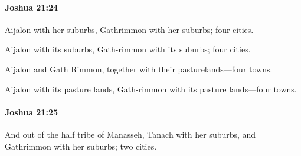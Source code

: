 		\paragraph{Joshua 21:24} %
			\label{JOSHUA-21-24}

			Aijalon with her suburbs, Gathrimmon with her suburbs; four cities.

			\begin{versebox}
					\item[BHS] 
					\item[ASV] Aijalon with its suburbs, Gath-rimmon with its suburbs; four cities.
					\item[NIV] Aijalon and Gath Rimmon, together with their pasturelands—four towns.
					\item[NRSV] Aijalon with its pasture lands, Gath-rimmon with its pasture lands—four towns.
			\end{versebox}

		\paragraph{Joshua 21:25} %
			\label{JOSHUA-21-25}

			And out of the half tribe of Manasseh, Tanach with her suburbs, and Gathrimmon with her suburbs; two cities.

